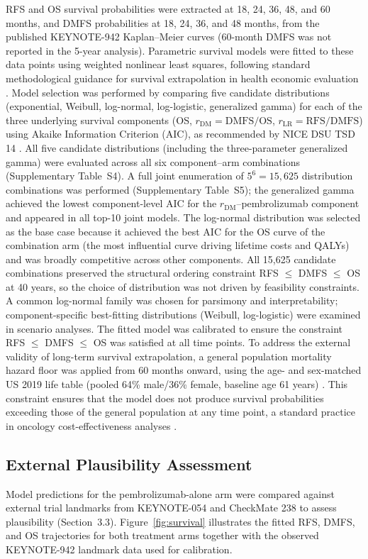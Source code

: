 \documentclass[12pt,a4paper]{article}
\begin{document}
RFS and OS survival probabilities were extracted at 18, 24, 36, 48, and 60 months, and DMFS probabilities at 18, 24, 36, and 48 months, from the published \mbox{KEYNOTE-942} Kaplan--Meier curves \cite{khattak2026} (60-month DMFS was not reported in the 5-year analysis). Parametric survival models were fitted to these data points using weighted nonlinear least squares, following standard methodological guidance for survival extrapolation in health economic evaluation \cite{latimer2011,latimer2013,ishak2013}. Model selection was performed by comparing five candidate distributions (exponential, Weibull, log-normal, log-logistic, generalized gamma) for each of the three underlying survival components (OS, $r_{\text{DM}} = \text{DMFS}/\text{OS}$, $r_{\text{LR}} = \text{RFS}/\text{DMFS}$) using Akaike Information Criterion (AIC), as recommended by NICE DSU TSD 14 \cite{latimer2011}. All five candidate distributions (including the three-parameter generalized gamma) were evaluated across all six component--arm combinations (Supplementary Table~S4). A full joint enumeration of $5^6 = 15,625$ distribution combinations was performed (Supplementary Table~S5); the generalized gamma achieved the lowest component-level AIC for the $r_{\text{DM}}$--pembrolizumab component and appeared in all top-10 joint models. The log-normal distribution was selected as the base case because it achieved the best AIC for the OS curve of the combination arm (the most influential curve driving lifetime costs and QALYs) and was broadly competitive across other components. All 15,625 candidate combinations preserved the structural ordering constraint RFS $\leq$ DMFS $\leq$ OS at 40 years, so the choice of distribution was not driven by feasibility constraints. A common log-normal family was chosen for parsimony and interpretability; component-specific best-fitting distributions (Weibull, log-logistic) were examined in scenario analyses. The fitted model was calibrated to ensure the constraint RFS $\leq$ DMFS $\leq$ OS was satisfied at all time points. To address the external validity of long-term survival extrapolation, a general population mortality hazard floor was applied from 60 months onward, using the age- and sex-matched US 2019 life table (pooled 64\% male/36\% female, baseline age 61 years) \cite{arias2022}. This constraint ensures that the model does not produce survival probabilities exceeding those of the general population at any time point, a standard practice in oncology cost-effectiveness analyses \cite{latimer2011,zhang2023}.

\subsection{External Plausibility Assessment}
Model predictions for the \mbox{pembrolizumab}-alone arm were compared against external trial landmarks from KEYNOTE-054 and CheckMate 238 to assess plausibility (Section~3.3).
Figure~\ref{fig:survival} illustrates the fitted RFS, DMFS, and OS trajectories for both treatment arms together with the observed \mbox{KEYNOTE-942} landmark data used for calibration.
\end{document}
